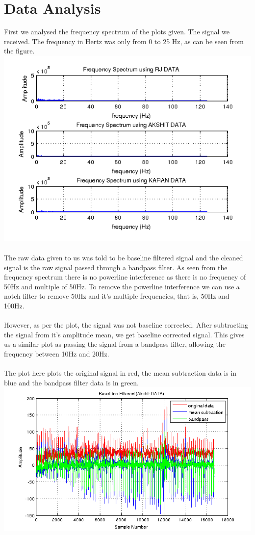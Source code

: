 \documentclass{article}
\begin{document}
\section{Data Analysis}
First we analysed the frequency spectrum of the plots given. The signal we
received. The frequency in Hertz was only from 0 to 25 Hz, as can be seen from
the figure. \\
\includegraphics[width=\textwidth]{freq} \\ \\ 
The raw data given to us was told to be baseline filtered signal and the cleaned
signal is the raw signal passed through a bandpass filter. As seen from the
frequency spectrum there is no powerline interference as there is no frequency
of 50Hz and multiple of 50Hz. To remove the powerline interference we can use
a notch filter to remove 50Hz and it's multiple frequencies, that is, 50Hz and
100Hz.\\ \\
However, as per the plot, the signal was not baseline corrected. After
subtracting the signal from it's amplitude mean, we get baseline corrected
signal. This gives us a similar plot as passing the signal from a bandpass
filter, allowing the frequency between 10Hz and 20Hz. \\ \\
The plot here plots the original signal in red, the mean subtraction data is in
blue and the bandpass filter data is in green. \\ 
\includegraphics[width=\textwidth]{baseline} \\ \\ 
\end{document}
